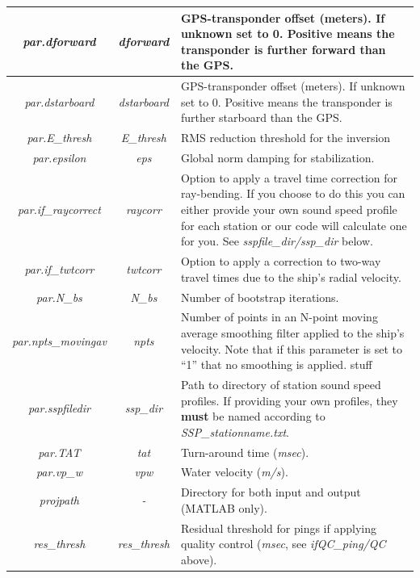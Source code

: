 \documentclass[titlepage, 12pt]{article}
\begin{document}
\begin{table}[H]
\begin{tabularx}{\linewidth}{|c|c|X|}
    \textit{par.dforward}       & \textit{dforward}          & GPS-transponder offset (meters). If unknown set to 0. Positive means the transponder is further forward than the GPS. \\ \hline
    \textit{par.dstarboard}     & \textit{dstarboard}        & GPS-transponder offset (meters). If unknown set to 0. Positive means the transponder is further starboard than the GPS. \\ \hline
    \textit{par.E\_thresh}      & \textit{E\_thresh}         & RMS reduction threshold for the inversion \\ \hline
    \textit{par.epsilon}        & \textit{eps}               & Global norm damping for stabilization.\\ \hline
    \textit{par.if\_raycorrect} & \textit{raycorr}           & Option to apply a travel time correction for ray-bending. If you choose to do this you can either provide your own sound speed profile for each station or our code will calculate one for you. See \textit{sspfile\_dir/ssp\_dir} below. \\ \hline
    \textit{par.if\_twtcorr}    & \textit{twtcorr}           & Option to apply a correction to two-way travel times due to the ship's radial velocity.\\ \hline
    \textit{par.N\_bs}          & \textit{N\_bs}             & Number of bootstrap iterations.\\ \hline
    \textit{par.npts\_movingav} & \textit{npts}              & Number of points in an N-point moving average smoothing filter applied to the ship's velocity. Note that if this parameter is set to “1” that no smoothing is applied. stuff\\ \hline
    \textit{par.sspfiledir}     & \textit{ssp\_dir}          & Path to directory of station sound speed profiles. If providing your own profiles, they \textbf{must} be named according to \textit{SSP\_stationname.txt}. \\ \hline
    \textit{par.TAT}            & \textit{tat}               & Turn-around time (\textit{msec}).\\ \hline
    \textit{par.vp\_w}          & \textit{vpw}               & Water velocity (\textit{m/s}).\\ \hline
    \textit{projpath}           & \textit{-}                 & Directory for both input and output (MATLAB only).\\ \hline
    \textit{res\_thresh}        & \textit{res\_thresh}       & Residual threshold for pings if applying quality control (\textit{msec}, see \textit{ifQC\_ping/QC} above).\\ \hline
   \end{tabularx}
  \end{table}
\end{document}
